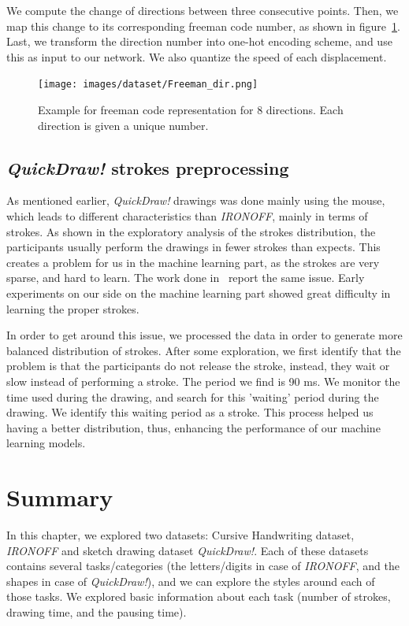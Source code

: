     \par We compute the change of directions between three consecutive points. Then, we map this change to its corresponding freeman code number, as shown in figure~\ref{fig:freeman_dir}. Last, we transform the direction number into one-hot encoding scheme, and use this as input to our network. We also quantize the speed of each displacement.

    \begin{figure}[htbp!]
    \centering
    \texttt{[image: images/dataset/Freeman\_dir.png]}
    \caption{Example for freeman code representation for 8 directions. Each direction is given a unique number.}
    \label{fig:freeman_dir}
    \end{figure}

    \subsection{\textit{QuickDraw!} strokes preprocessing}
    \par As mentioned earlier, \textit{QuickDraw!} drawings was done mainly using the mouse, which leads to different characteristics than \textit{IRONOFF}, mainly in terms of strokes. As shown in the exploratory analysis of the strokes distribution, the participants usually perform the drawings in fewer strokes than expects. This creates a problem for us in the machine learning part, as the strokes are very sparse, and hard to learn. The work done in~\citep{ha2017neural} report the same issue. Early experiments on our side on the machine learning part showed great difficulty in learning the proper strokes.

    \par In order to get around this issue, we processed the data in order to generate more balanced distribution of strokes. After some exploration, we first identify that the problem is that the participants do not release the stroke, instead, they wait or slow instead of performing a stroke. The period we find is 90 ms. We monitor the time used during the drawing, and search for this 'waiting' period during the drawing. We identify this waiting period as a stroke. This process helped us having a better distribution, thus, enhancing the performance of our machine learning models.

\section{Summary}
  \par In this chapter, we explored two datasets: Cursive Handwriting dataset, \textit{IRONOFF} and sketch drawing dataset \textit{QuickDraw!}. Each of these datasets contains several tasks/categories (the letters/digits in case of \textit{IRONOFF}, and the shapes in case of \textit{QuickDraw!}), and we can explore the styles around each of those tasks. We explored basic information about each task (number of strokes, drawing time, and the pausing time).

